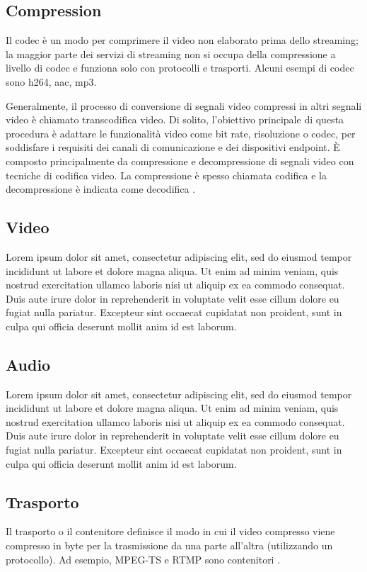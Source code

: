 \subsection{Compression}
Il codec è un modo per comprimere il video non elaborato prima dello streaming; la maggior parte dei servizi di streaming non si occupa della compressione a livello di codec e funziona solo con protocolli e trasporti. Alcuni esempi di codec sono h264, aac, mp3.

Generalmente, il processo di conversione di segnali video compressi in altri segnali video è chiamato transcodifica video. Di solito, l'obiettivo principale di questa procedura è adattare le funzionalità video come bit rate, risoluzione o codec, per soddisfare i requisiti dei canali di comunicazione e dei dispositivi endpoint. È composto principalmente da compressione e decompressione di segnali video con tecniche di codifica video. La compressione è spesso chiamata codifica e la decompressione è indicata come decodifica \parencite{CombinedICTTechnologies}.

\subsection{Video}
Lorem ipsum dolor sit amet, consectetur adipiscing elit, sed do eiusmod tempor incididunt ut labore et dolore magna aliqua. Ut enim ad minim veniam, quis nostrud exercitation ullamco laboris nisi ut aliquip ex ea commodo consequat. Duis aute irure dolor in reprehenderit in voluptate velit esse cillum dolore eu fugiat nulla pariatur. Excepteur sint occaecat cupidatat non proident, sunt in culpa qui officia deserunt mollit anim id est laborum.

\subsection{Audio}
Lorem ipsum dolor sit amet, consectetur adipiscing elit, sed do eiusmod tempor incididunt ut labore et dolore magna aliqua. Ut enim ad minim veniam, quis nostrud exercitation ullamco laboris nisi ut aliquip ex ea commodo consequat. Duis aute irure dolor in reprehenderit in voluptate velit esse cillum dolore eu fugiat nulla pariatur. Excepteur sint occaecat cupidatat non proident, sunt in culpa qui officia deserunt mollit anim id est laborum.

\subsection{Trasporto}
Il trasporto o il contenitore definisce il modo in cui il video compresso viene compresso in byte per la trasmissione da una parte all'altra (utilizzando un protocollo). Ad esempio, MPEG-TS e RTMP sono contenitori \parencite{CombinedICTTechnologies}.

